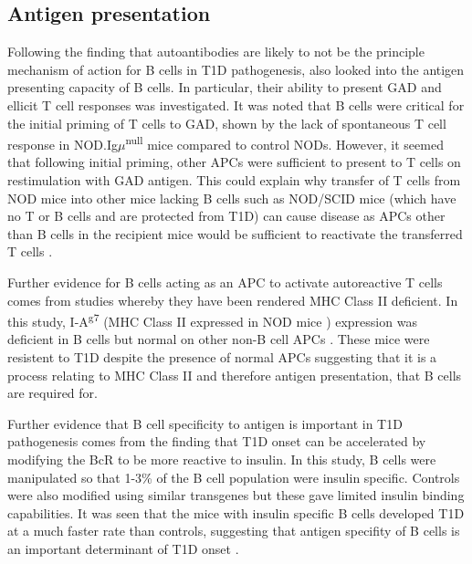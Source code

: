 \subsection{Antigen presentation}


Following the finding that autoantibodies are likely to not be the principle mechanism of action for B cells in T1D pathogenesis, \citet{Serreze1998} also looked into the antigen presenting capacity of B cells.
In particular, their ability to present GAD and ellicit T cell responses was investigated.
It was noted that B cells were critical for the initial priming of T cells to GAD, shown by the lack of spontaneous T cell response in NOD.Ig$\mu$\textsuperscript{null} mice compared to control NODs.
However, it seemed that following initial priming, other APCs were sufficient to present to T cells on restimulation with GAD antigen.
This could explain why transfer of T cells from NOD mice into other mice lacking B cells such as NOD/SCID mice (which have no T or B cells and are protected from T1D) can cause disease as APCs other than B cells in the recipient mice would be sufficient to reactivate the transferred T cells \citep{Charlton2001}.

Further evidence for B cells acting as an APC to activate autoreactive T cells comes from studies whereby they have been rendered MHC Class II deficient.
In this study, I-A\textsuperscript{g7} (MHC Class II expressed in NOD mice \citep{Stratmann2000}) expression was deficient in B cells but normal on other non-B cell APCs \citep{Noorchashm1999}.
These mice were resistent to T1D despite the presence of normal APCs suggesting that it is a process relating to MHC Class II and therefore antigen presentation, that B cells are required for.

Further evidence that B cell specificity to antigen is important in T1D pathogenesis comes from the finding that T1D onset can be accelerated by modifying the BcR to be more reactive to insulin.
In this study, B cells were manipulated so that 1-3\% of the B cell population were insulin specific.
Controls were also modified using similar transgenes but these gave limited insulin binding capabilities.
It was seen that the mice with insulin specific B cells developed T1D at a much faster rate than controls, suggesting that antigen specifity of B cells is an important determinant of T1D onset \citep{Hulbert2001}.

